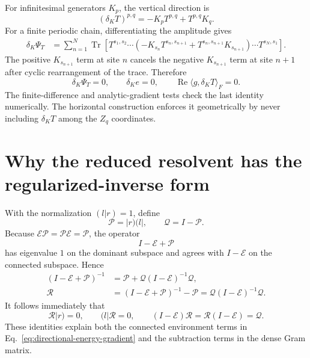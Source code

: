 \documentclass[11pt]{article}
\newcommand{\E}{\mathcal{E}}
\newcommand{\Res}{\mathcal{R}}
\newcommand{\Proj}{\mathcal{P}}
\newcommand{\Qproj}{\mathcal{Q}}
\newcommand{\Tr}{\operatorname{Tr}}
\newcommand{\RePart}{\operatorname{Re}}
\begin{document}
For infinitesimal generators $K_p$, the vertical direction is
\begin{equation}
  (\delta_KT)^{p,q}
  =
  -K_pT^{p,q}+T^{p,q}K_q.
  \label{eq:vertical-direction-appendix}
\end{equation}
For a finite periodic chain, differentiating the amplitude gives
\begin{align}
  \delta_K\Psi_T
  &=
  \sum_{n=1}^N
  \Tr\!\left[
    T^{s_1,s_2}\cdots
    \left(
      -K_{s_n}T^{s_n,s_{n+1}}
      +T^{s_n,s_{n+1}}K_{s_{n+1}}
    \right)
    \cdots T^{s_N,s_1}
  \right].
  \label{eq:gauge-amplitude-derivative}
\end{align}
The positive $K_{s_{n+1}}$ term at site $n$ cancels the negative
$K_{s_{n+1}}$ term at site $n+1$ after cyclic rearrangement of the trace.
Therefore
\begin{equation}
  \delta_K\Psi_T=0,
  \qquad
  \delta_Ke=0,
  \qquad
  \RePart\langle g,\delta_KT\rangle_F=0.
  \label{eq:gauge-gradient-annihilation}
\end{equation}
The finite-difference and analytic-gradient tests check the last identity
numerically.  The horizontal construction enforces it geometrically by never
including $\delta_KT$ among the $Z_q$ coordinates.

\section{Why the reduced resolvent has the regularized-inverse form}
\label{app:reduced-resolvent}

With the normalization $(l|r)=1$, define
\begin{equation}
  \Proj=|r)(l|,
  \qquad
  \Qproj=I-\Proj.
  \label{eq:projectors-appendix}
\end{equation}
Because $\E\Proj=\Proj\E=\Proj$, the operator
\begin{equation}
  I-\E+\Proj
  \label{eq:regularized-transfer-operator}
\end{equation}
has eigenvalue $1$ on the dominant subspace and agrees with $I-\E$ on the
connected subspace.  Hence
\begin{align}
  \left(I-\E+\Proj\right)^{-1}
  &=\Proj+\Qproj(I-\E)^{-1}\Qproj,
  \label{eq:regularized-inverse-split}\\
  \Res
  &=
  \left(I-\E+\Proj\right)^{-1}-\Proj
  =
  \Qproj(I-\E)^{-1}\Qproj.
  \label{eq:resolvent-equivalence-appendix}
\end{align}
It follows immediately that
\begin{equation}
  \Res|r)=0,
  \qquad
  (l|\Res=0,
  \qquad
  (I-\E)\Res=\Res(I-\E)=\Qproj.
  \label{eq:resolvent-identities}
\end{equation}
These identities explain both the connected environment terms in
Eq.~\eqref{eq:directional-energy-gradient} and the subtraction terms in the
dense Gram matrix.
\end{document}
